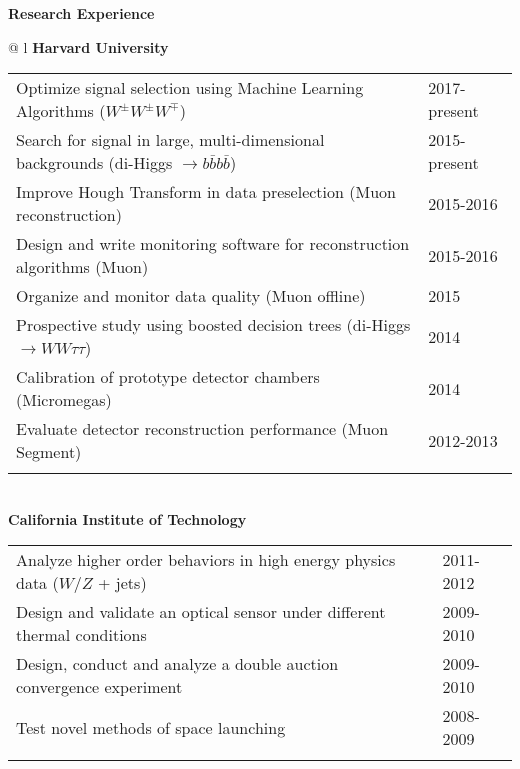 \documentclass[letterpaper,11pt,oneside]{article}
\begin{document}
 \raggedright
 \textbf{\Large{Research Experience}} \\
 \normalsize
\begin{flushleft}
 \begin{tabular}{@{} l}
    \textbf{Harvard University} \\ 
    \begin{tabular}{@{} l l }
 Optimize signal selection using Machine Learning Algorithms ($W^{\pm} W^{\pm} W^{\mp}$) & 2017-present\\
 Search for signal in large, multi-dimensional backgrounds (di-Higgs $\to b\bar{b}b\bar{b}$) & 2015-present\\
 Improve Hough Transform in data preselection (Muon reconstruction) & 2015-2016\\
 Design and write monitoring software for reconstruction algorithms (Muon) & 2015-2016\\
 Organize and monitor data quality (Muon offline) & 2015\\
 Prospective study using boosted decision trees (di-Higgs $\to WW\tau\tau$) & 2014\\
 Calibration of prototype detector chambers (Micromegas) & 2014\\
 Evaluate detector reconstruction performance (Muon Segment) & 2012-2013\\
    \hspace{0.8\linewidth} & \hspace{0.1\linewidth} \\
     \end{tabular}
     \\
     \textbf{California Institute of Technology} \\
     \begin{tabular}{@{} l l }
 Analyze higher order behaviors in high energy physics data ($W/Z$ + jets) &2011-2012\\
 Design and validate an optical sensor under different thermal conditions &2009-2010\\
 Design, conduct and analyze a double auction convergence experiment &2009-2010\\
 Test novel methods of space launching &2008-2009\\
    \hspace{0.8\linewidth} & \hspace{0.1\linewidth} \\
      \end{tabular}
      \end{tabular}
\end{flushleft}
\end{document}
